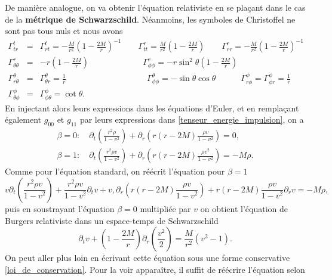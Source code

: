 \documentclass[11pt,a4paper]{article}
\begin{document}
De manière analogue, on va obtenir l'équation relativiste en se plaçant dans le cas de la \textbf{métrique de Schwarzschild}. Néanmoins, les symboles de Christoffel ne sont pas tous nuls et nous avons
\begin{eqnarray}
		\Gamma^{t}_{tr} &=& \Gamma^{t}_{rt} =
						  - \frac{M}{r^2}\left(1-\frac{2M}{r}\right)^{-1} \qquad
		\Gamma^{r}_{tt} = \frac{M}{r^2}\left(1-\frac{2M}{r}\right) \qquad
		\Gamma^{r}_{rr} = -\frac{M}{r^2}\left(1-\frac{2M}{r}\right)^{-1} \\
		\Gamma^{r}_{\theta\theta} &=& -r\left(1-\frac{2M}{r}\right) \qquad\qquad\qquad\:\:
		\Gamma^{r}_{\phi\phi} = -r\sin^2\theta\left(1-\frac{2M}{r}\right) \\
		\Gamma^{\theta}_{r \theta} &=& \Gamma^{\theta}_{\theta r}  = \frac{1}{r} \qquad\qquad\qquad\qquad\quad\:\:\:
		\Gamma^{\theta}_{\phi\phi} = -\sin\theta\cos\theta \quad\qquad
		\Gamma^{\phi}_{r\phi} = \Gamma^{\phi}_{\phi r}  = \frac{1}{r} \\
		\Gamma^{\phi}_{\theta\phi} &=& \Gamma^{\phi}_{\phi\theta}  = \cot \theta.
\end{eqnarray}
En injectant alors leurs expressions dans les équations d'Euler, et en remplaçant également  $g_{00}$ et $g_{11}$ par leurs expressions dans \eqref{tenseur_energie_impulsion}, on a
\begin{align}
	\beta = 0 : \quad\partial_t(\frac{r^2 \rho }{1 - v^2}) + \partial_r(r(r-2M)\frac{\rho v}{1-v^2}) = 0,\\
	\beta = 1 : \quad\partial_t (\frac{r^2\rho v}{1 - v^2}) + \partial_r(r(r-2M)\frac{\rho v^2}{1 - v^2}) = -M\rho.
\end{align}
Comme pour l'équation standard, on réécrit l'équation pour $\beta =1$
\begin{equation}
	v\partial_t(\frac{r^2\rho v}{1 - v^2}) + \frac{r^2\rho v}{1 - v^2} \partial_t v + v, \partial_r(r(r-2M)\frac{\rho v}{1-v^2}) + r(r-2M)\frac{\rho v}{1-v^2}\partial_r v = -M\rho,
\end{equation}
puis en soustrayant l'équation $\beta = 0$ multipliée par $v$ on obtient l'équation de Burgers relativiste dans un espace-temps de Schwarzschild
\begin{equation}
	\partial_t v + \left(1 - \frac{2M}{r}\right)\partial_r\left(\frac{v^2}{2}\right) = \frac{M}{r^2}\left(v^2 -1\right).
\end{equation}
On peut aller plus loin en écrivant cette équation sous une forme conservative \eqref{loi_de_conservation}. Pour la voir apparaître,  il suffit de réécrire l'équation selon
\end{document}
